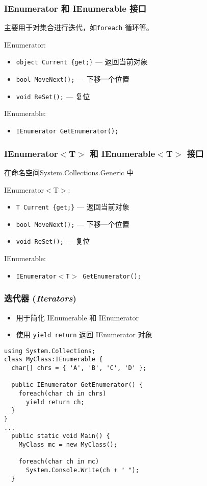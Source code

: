 \begin{frame}
\frametitle{IEnumerator 和 IEnumerable 接口}

主要用于对集合进行迭代，如\texttt{foreach} 循环等。
\vskip8pt

IEnumerator:
\begin{itemize}
\item \texttt{object Current \{get;\}} --- 返回当前对象
\item \texttt{bool MoveNext();} --- 下移一个位置
\item \texttt{void ReSet();} --- 复位
\end{itemize}
\vskip4pt

IEnumerable:
\begin{itemize}
\item \texttt{IEnumerator GetEnumerator();}
\end{itemize}
\vskip8pt

\end{frame}

\begin{frame}
\frametitle{IEnumerator$<$T$>$ 和 IEnumerable$<$T$>$ 接口}
在命名空间System.Collections.Generic 中
\vskip8pt

IEnumerator$<$T$>$:
\begin{itemize}
\item \texttt{T Current \{get;\}} --- 返回当前对象
\item \texttt{bool MoveNext();} --- 下移一个位置
\item \texttt{void ReSet();} --- 复位
\end{itemize}
\vskip4pt 

IEnumerable:
\begin{itemize}
\item \texttt{IEnumerator$<$T$>$ GetEnumerator();}
\end{itemize}
\end{frame}

\begin{frame}[fragile]
\frametitle{迭代器 (\textit{Iterators})}
\begin{itemize}
\item 用于简化 IEnumerable 和 IEnumerator
\item 使用 \texttt{yield return} 返回 IEnumerator 对象
\end{itemize}

\begin{lstlisting}
using System.Collections;
class MyClass:IEnumerable {
  char[] chrs = { 'A', 'B', 'C', 'D' };

  public IEnumerator GetEnumerator() {
    foreach(char ch in chrs)
      yield return ch;
  }
}
...
  public static void Main() {
    MyClass mc = new MyClass();

    foreach(char ch in mc)
      System.Console.Write(ch + " ");
  }
\end{lstlisting}
\end{frame}


